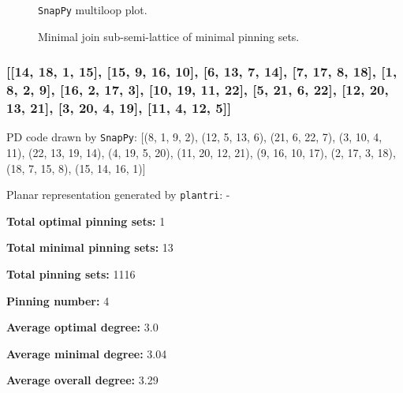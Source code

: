 \documentclass{article}%
\begin{document}
\begin{multicols}{2}
\begin{figure}[H]
\centering

\caption{\texttt{SnapPy} multiloop plot.}
\label{fig:tex/img/[[22, 15, 1, 16], [16, 10, 17, 9], [4, 21, 5, 22], [5, 14, 6, 15], [1, 11, 2, 10], [17, 2, 18, 3], [3, 8, 4, 9], [13, 20, 14, 21], [6, 20, 7, 19], [11, 19, 12, 18], [12, 7, 13, 8]].svg}
\end{figure}
\columnbreak

\begin{figure}[H]
\centering
\scalebox{0.8}{}
\caption{Minimal join sub-semi-lattice of minimal pinning sets.}
\label{fig:tex/img/[[22, 15, 1, 16], [16, 10, 17, 9], [4, 21, 5, 22], [5, 14, 6, 15], [1, 11, 2, 10], [17, 2, 18, 3], [3, 8, 4, 9], [13, 20, 14, 21], [6, 20, 7, 19], [11, 19, 12, 18], [12, 7, 13, 8]].pgf}
\end{figure}
\end{multicols}

\newpage

\subsubsection{[[14, 18, 1, 15], [15, 9, 16, 10], [6, 13, 7, 14], [7, 17, 8, 18], [1, 8, 2, 9], [16, 2, 17, 3], [10, 19, 11, 22], [5, 21, 6, 22], [12, 20, 13, 21], [3, 20, 4, 19], [11, 4, 12, 5]]}

{\small\noindent PD code drawn by \texttt{SnapPy}: [(8, 1, 9, 2), (12, 5, 13, 6), (21, 6, 22, 7), (3, 10, 4, 11), (22, 13, 19, 14), (4, 19, 5, 20), (11, 20, 12, 21), (9, 16, 10, 17), (2, 17, 3, 18), (18, 7, 15, 8), (15, 14, 16, 1)]}

{\small\noindent Planar representation generated by \texttt{plantri}: -}

\begin{multicols}{2}
{\normalsize \noindent\textbf{Total optimal pinning sets:} 1

\noindent\textbf{Total minimal pinning sets:} 13

\noindent\textbf{Total pinning sets:} 1116

\noindent\textbf{Pinning number:} 4

}
\columnbreak

{\normalsize \noindent\textbf{Average optimal degree:} 3.0

\noindent\textbf{Average minimal degree:} 3.04

\noindent\textbf{Average overall degree:} 3.29

}
\end{multicols}
\end{document}

